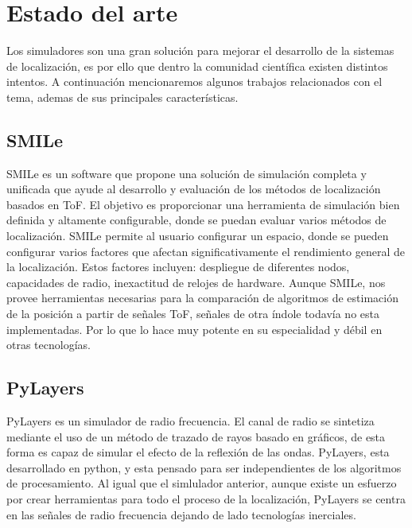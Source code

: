 \section{Estado del arte}\label{S2}
Los simuladores son una gran solución para mejorar el desarrollo de la sistemas de localización, es por ello que dentro la comunidad científica existen distintos intentos. A continuación mencionaremos algunos trabajos relacionados con el tema, ademas de sus principales características.



\subsection{SMILe}

SMILe \cite{Jankowski2018} es un software que propone una solución de simulación completa y unificada que ayude al desarrollo y evaluación de los métodos de localización basados en  ToF. El objetivo es proporcionar una herramienta de simulación bien definida y altamente configurable, donde se puedan evaluar varios métodos de localización. 
SMILe permite al usuario configurar un espacio, donde se pueden configurar varios factores que afectan significativamente el rendimiento general de la localización. Estos factores incluyen: despliegue de diferentes nodos, capacidades de radio, inexactitud de relojes de hardware.
Aunque SMILe, nos provee herramientas necesarias para la comparación de algoritmos de estimación de la posición a partir de señales ToF, señales de otra índole todavía no esta implementadas. Por lo que lo hace muy potente en su especialidad y débil en otras tecnologías.

\subsection{PyLayers}

PyLayers\cite{Amiot2013} es un simulador de radio frecuencia.
El canal de radio se sintetiza mediante el uso de un método de trazado de rayos basado en gráficos, de esta forma es capaz de simular el efecto de la reflexión de las ondas.  PyLayers, esta desarrollado en python, y esta pensado para ser independientes de los algoritmos de procesamiento. 
Al igual que el simlulador anterior, aunque existe un esfuerzo por crear herramientas para todo el proceso de la localización, PyLayers se centra en las señales de radio frecuencia dejando de lado tecnologías inerciales.


